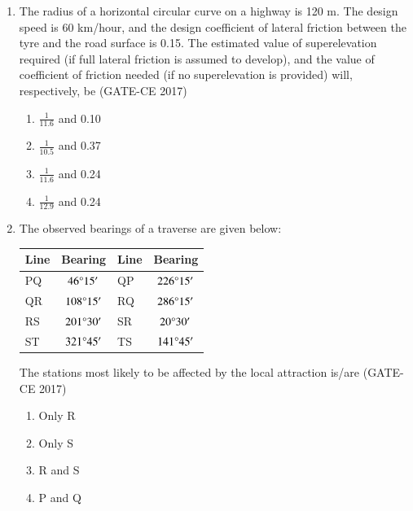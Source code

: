 \documentclass[journal,12pt,onecolumn]{article}
\theoremstyle{remark}
\begin{document}
\begin{enumerate}
    \item The radius of a horizontal circular curve on a highway is 120 m. The design speed is 60 km/hour, and the design coefficient of lateral friction between the tyre and the road surface is 0.15. The estimated value of superelevation required (if full lateral friction is assumed to develop), and the value of coefficient of friction needed (if no superelevation is provided) will, respectively, be \hfill (GATE-CE 2017)
    \begin{multicols}{2}
    \begin{enumerate}
        \item $\frac{1}{11.6}$ and 0.10
        \item $\frac{1}{10.5}$ and 0.37
        \item $\frac{1}{11.6}$ and 0.24
        \item $\frac{1}{12.9}$ and 0.24
    \end{enumerate}
    \end{multicols}

    \item The observed bearings of a traverse are given below:
    \begin{table}[H]
    \centering
    \begin{tabular}{|l|c|l|c|}
    \hline
    Line & Bearing & Line & Bearing \\
    \hline
    PQ & $46\degree15'$ & QP & $226\degree15'$ \\
    QR & $108\degree15'$ & RQ & $286\degree15'$ \\
    RS & $201\degree30'$ & SR &$20\degree30'$ \\
    ST & $321\degree45'$ & TS & $141\degree45'$ \\
    \hline
    \end{tabular}
    \end{table}
    The stations most likely to be affected by the local attraction is/are \hfill (GATE-CE 2017)
    \begin{multicols}{4}
    \begin{enumerate}
        \item Only R
        \item Only S
        \item R and S
        \item P and Q
    \end{enumerate}
    \end{multicols}


\end{enumerate}
\end{document}
